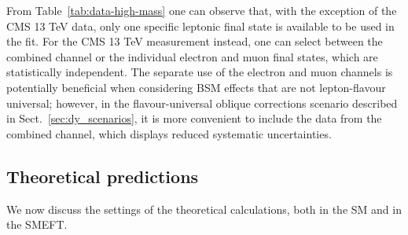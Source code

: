 \documentclass[withindex,glossary]{cam-thesis}
\begin{document}
From Table~\ref{tab:data-high-mass} one can observe that, with the exception of the CMS 13 TeV data,
only one specific leptonic final state is available to be used in the fit.
%
For the CMS 13 TeV measurement instead, one can select between the combined channel or the individual
electron and muon final states, which are statistically independent.
%
The separate use of the electron and muon channels is potentially beneficial when considering BSM effects that are
not lepton-flavour universal; however, in the flavour-universal oblique corrections scenario
described in Sect.~\ref{sec:dy_scenarios},
it is more convenient to include the data
from the combined channel, which displays reduced systematic
uncertainties. 


\subsection{Theoretical predictions}
\label{sec:dy_theory}

We now discuss the settings of the theoretical calculations, both in
the SM and in the SMEFT. 
\end{document}

